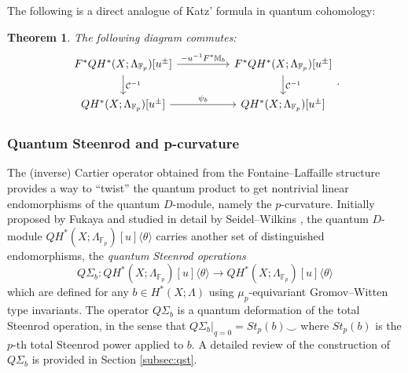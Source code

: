 \documentclass[reqno]{amsart}
\numberwithin{equation}{section}
\numberwithin{equation}{section}
\numberwithin{equation}{section}
\newtheorem{thm}{Theorem}[section]
\theoremstyle{definition}
\theoremstyle{remark}
\theoremstyle{remark}
\newtheorem{rem}[thm]{Remark}
\begin{document}
The following is a direct analogue of Katz' formula in quantum cohomology: 

\begin{thm} \label{thm:Cartierconjugation}  The following diagram commutes:
\begin{equation}\label{diagram:katz}
        \begin{tikzcd}
             F^*QH^*(X;\Lambda_{\mathbb{F}_p})[u^{\pm}]  \arrow[rr, "-u^{-1}F^*\mathbb{M}_b"] \dar["\mathcal{C}^{-1}"] &&  F^*QH^*(X;\Lambda_{\mathbb{F}_p})[u^{\pm}]  \dar["\mathcal{C}^{-1}"] \\
             QH^*(X;\Lambda_{\mathbb{F}_p})[u^{\pm}] \arrow[rr, "\psi_b"] && QH^*(X;\Lambda_{\mathbb{F}_p})[u^{\pm}]
        \end{tikzcd}.
    \end{equation}
 \end{thm}


\subsubsection{Quantum Steenrod and p-curvature} 
The (inverse) Cartier operator obtained from the Fontaine--Laffaille structure provides a way to ``twist'' the quantum product to get nontrivial linear endomorphisms of the quantum $D$-module, namely the $p$-curvature.  Initially proposed by Fukaya \cite{Fuk97} and studied in detail by Seidel--Wilkins \cite{Wil20, seidel-wilkins}, the quantum $D$-module $QH^*(X;\Lambda_{\mathbb{F}_p})[u]\langle \theta \rangle$ carries another set of distinguished endomorphisms, the \emph{quantum Steenrod operations}
\begin{equation}
    Q\Sigma_b: QH^*(X;\Lambda_{\mathbb{F}_p})[u]\langle \theta \rangle \to QH^*(X;\Lambda_{\mathbb{F}_p})[u]\langle \theta \rangle
\end{equation}
which are defined for any $b \in H^*(X; \Lambda)$ using $\mu_p$-equivariant Gromov--Witten type invariants. The operator $Q\Sigma_b$ is a quantum deformation of the total Steenrod operation, in the sense that $Q\Sigma_b |_{q=0} = St_p(b) \smile$ where $St_p(b)$ is the $p$-th total Steenrod power applied to $b$. A detailed review of the construction of $Q\Sigma_b$ is provided in Section \ref{subsec:qst}.
\end{document}
